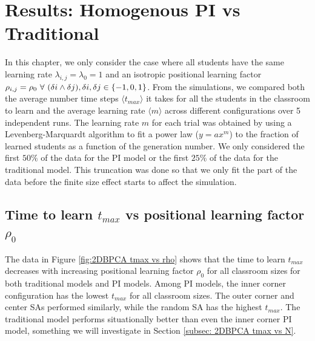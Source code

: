 \section{Results: Homogenous PI vs Traditional}
In this chapter, we only consider the case where all students have the same learning rate $\lambda_{i,j} = \lambda_0 = 1$ and an isotropic positional learning factor $\rho_{i,j} = \rho_0 \space ~\forall~ (\delta i \land \delta j),  \delta i, \delta j \in \lbrace -1,0,1 \rbrace $. From the simulations, we compared both the average number time steps $\langle t_{max} \rangle$ it takes for all the students in the classroom to learn and the average learning rate $\langle m \rangle$ across different configurations over 5 independent runs. The learning rate $m$ for each trial was obtained by using a Levenberg-Marquardt algorithm to fit a power law ($y = ax^m$) to the fraction of learned students as a function of the generation number. We only considered the first $50\%$ of the data for the PI model or the first $25\%$ of the data for the traditional model. This truncation was done so that we only fit the part of the data before the finite size effect starts to affect the simulation.

\subsection{Time to learn $t_{max}$ vs positional learning factor $\rho_0$} \label{subsec: 2DBPCA tmax vs rho}

The data in Figure \ref{fig:2DBPCA tmax vs rho} shows that the time to learn $t_{max}$ decreases with increasing positional learning factor $\rho_0$ for all classroom sizes for both traditional models and PI models. Among PI models, the inner corner configuration has the lowest $t_{max}$ for all classroom sizes. The outer corner and center SAs performed similarly, while the random SA has the highest $t_{max}$. The traditional model performs situationally better than even the inner corner PI model, something we will investigate in Section \ref{subsec: 2DBPCA tmax vs N}.

